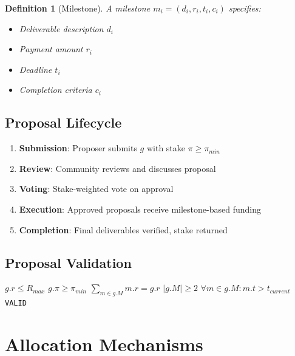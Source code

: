 \documentclass[11pt,a4paper]{article}
\newtheorem{definition}{Definition}
\begin{document}
\begin{definition}[Milestone]
A milestone $m_i = (d_i, r_i, t_i, c_i)$ specifies:
\begin{itemize}
    \item Deliverable description $d_i$
    \item Payment amount $r_i$
    \item Deadline $t_i$
    \item Completion criteria $c_i$
\end{itemize}
\end{definition}

\subsection{Proposal Lifecycle}

\begin{enumerate}
    \item \textbf{Submission}: Proposer submits $g$ with stake $\pi \geq \pi_{min}$
    \item \textbf{Review}: Community reviews and discusses proposal
    \item \textbf{Voting}: Stake-weighted vote on approval
    \item \textbf{Execution}: Approved proposals receive milestone-based funding
    \item \textbf{Completion}: Final deliverables verified, stake returned
\end{enumerate}

\subsection{Proposal Validation}

\begin{algorithm}
\caption{Proposal Validation}
\begin{algorithmic}[1]
    \Require $g.r \leq R_{max}$ 
    \Require $g.\pi \geq \pi_{min}$ 
    \Require $\sum_{m \in g.M} m.r = g.r$ 
    \Require $|g.M| \geq 2$ 
    \Require $\forall m \in g.M: m.t > t_{current}$ 
    \State \Return \texttt{VALID}
\EndProcedure
\end{algorithmic}
\end{algorithm}

\section{Allocation Mechanisms}
\end{document}
